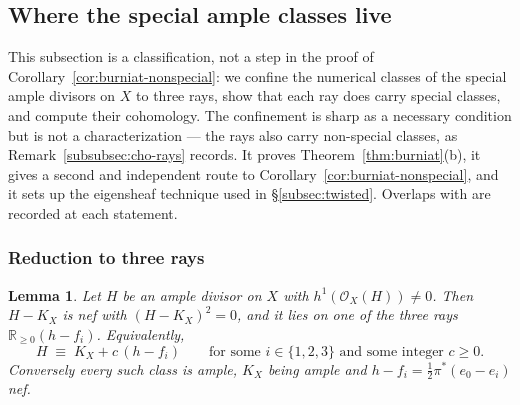 \documentclass[10pt,a4paper]{amsart}
\newtheorem{lemma}[theorem]{Lemma}
\newcommand{\OO}{\mathcal{O}}
\newcommand{\RR}{\mathbb{R}}
\begin{document}
\subsection{Where the special ample classes live}\label{subsec:rays}
This subsection is a classification, not a step in the proof of Corollary~\ref{cor:burniat-nonspecial}: we confine the numerical classes of the special ample divisors on $X$ to three rays, show that each ray does carry special classes, and compute their cohomology. The confinement is sharp as a necessary condition but is not a characterization --- the rays also carry non-special classes, as Remark~\ref{subsubsec:cho-rays} records. It proves Theorem~\ref{thm:burniat}(b), it gives a second and independent route to Corollary~\ref{cor:burniat-nonspecial}, and it sets up the eigensheaf technique used in \S\ref{subsec:twisted}. Overlaps with \cite{Cho26} are recorded at each statement.

\subsubsection{Reduction to three rays}
\begin{lemma}\label{lem:dichotomy}
Let $H$ be an ample divisor on $X$ with $h^1(\OO_X(H))\neq0$. Then $H-K_X$ is nef with $(H-K_X)^2=0$, and it lies on one of the three rays $\RR_{\ge0}(h-f_i)$. Equivalently,
\[
H\;\equiv\;K_X+c\,(h-f_i)\qquad\text{for some }i\in\{1,2,3\}\text{ and some integer }c\ge0 .
\]
Conversely every such class is ample, $K_X$ being ample and $h-f_i=\tfrac12\pi^*(e_0-e_i)$ nef.
\end{lemma}
\end{document}
